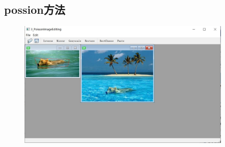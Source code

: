 \documentclass{article}
\begin{document}
	\subsection{possion方法}
	\begin{figure}[htb]
		\begin{center}
			\includegraphics[width=4in]{possion.jpg}
		\end{center}
	\end{figure}
\end{document}
